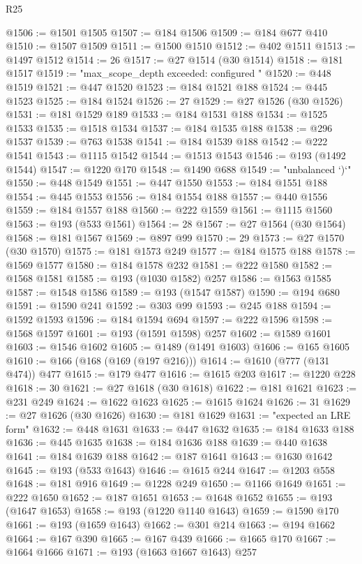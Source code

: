 \begin{lexlean}{R25}
\begin{coremodule}
@1506 := @1501 @1505
@1507 := @184 @1506
@1509 := @184 @677 @410
@1510 := @1507 @1509
@1511 := @1500 @1510
@1512 := @402 @1511
@1513 := @1497 @1512
@1514 := 26
@1517 := @27 @1514 (@30 @1514)
@1518 := @181 @1517
@1519 := "max_scope_depth exceeded: configured "
@1520 := @448 @1519
@1521 := @447 @1520
@1523 := @184 @1521 @188
@1524 := @445 @1523
@1525 := @184 @1524
@1526 := 27
@1529 := @27 @1526 (@30 @1526)
@1531 := @181 @1529 @189
@1533 := @184 @1531 @188
@1534 := @1525 @1533
@1535 := @1518 @1534
@1537 := @184 @1535 @188
@1538 := @296 @1537
@1539 := @763 @1538
@1541 := @184 @1539 @188
@1542 := @222 @1541
@1543 := @1115 @1542
@1544 := @1513 @1543
@1546 := @193 (@1492 @1544)
@1547 := @1220 @170
@1548 := @1490 @688
@1549 := "unbalanced `)`"
@1550 := @448 @1549
@1551 := @447 @1550
@1553 := @184 @1551 @188
@1554 := @445 @1553
@1556 := @184 @1554 @188
@1557 := @440 @1556
@1559 := @184 @1557 @188
@1560 := @222 @1559
@1561 := @1115 @1560
@1563 := @193 (@533 @1561)
@1564 := 28
@1567 := @27 @1564 (@30 @1564)
@1568 := @181 @1567
@1569 := @897 @99
@1570 := 29
@1573 := @27 @1570 (@30 @1570)
@1575 := @181 @1573 @249
@1577 := @184 @1575 @188
@1578 := @1569 @1577
@1580 := @184 @1578 @232
@1581 := @222 @1580
@1582 := @1568 @1581
@1585 := @193 (@1030 @1582) @257
@1586 := @1563 @1585
@1587 := @1548 @1586
@1589 := @193 (@1547 @1587)
@1590 := @194 @680
@1591 := @1590 @241
@1592 := @303 @99
@1593 := @245 @188
@1594 := @1592 @1593
@1596 := @184 @1594 @694
@1597 := @222 @1596
@1598 := @1568 @1597
@1601 := @193 (@1591 @1598) @257
@1602 := @1589 @1601
@1603 := @1546 @1602
@1605 := @1489 (@1491 @1603)
@1606 := @165 @1605
@1610 := @166 (@168 (@169 (@197 @216)))
@1614 := @1610 (@777 (@131 @474)) @477
@1615 := @179 @477
@1616 := @1615 @203
@1617 := @1220 @228
@1618 := 30
@1621 := @27 @1618 (@30 @1618)
@1622 := @181 @1621
@1623 := @231 @249
@1624 := @1622 @1623
@1625 := @1615 @1624
@1626 := 31
@1629 := @27 @1626 (@30 @1626)
@1630 := @181 @1629
@1631 := "expected an LRE form"
@1632 := @448 @1631
@1633 := @447 @1632
@1635 := @184 @1633 @188
@1636 := @445 @1635
@1638 := @184 @1636 @188
@1639 := @440 @1638
@1641 := @184 @1639 @188
@1642 := @187 @1641
@1643 := @1630 @1642
@1645 := @193 (@533 @1643)
@1646 := @1615 @244
@1647 := @1203 @558
@1648 := @181 @916
@1649 := @1228 @249
@1650 := @1166 @1649
@1651 := @222 @1650
@1652 := @187 @1651
@1653 := @1648 @1652
@1655 := @193 (@1647 @1653)
@1658 := @193 (@1220 @1140 @1643)
@1659 := @1590 @170
@1661 := @193 (@1659 @1643)
@1662 := @301 @214
@1663 := @194 @1662
@1664 := @167 @390
@1665 := @167 @439
@1666 := @1665 @170
@1667 := @1664 @1666
@1671 := @193 (@1663 @1667 @1643) @257

\end{coremodule}
\end{lexlean}
